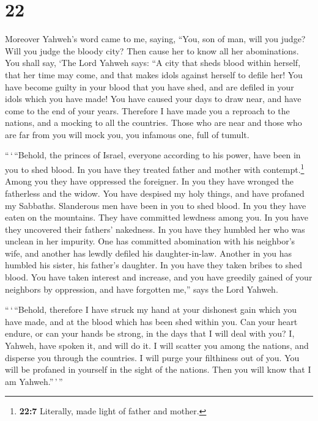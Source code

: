 \hypertarget{section-21}{%
\section{22}\label{section-21}}

 Moreover Yahweh's word came to me, saying, 
``You, son of man, will you judge? Will you judge the bloody city? Then
cause her to know all her abominations.  You shall say,
`The Lord Yahweh says: ``A city that sheds blood within herself, that
her time may come, and that makes idols against herself to defile her!
 You have become guilty in your blood that you have shed,
and are defiled in your idols which you have made! You have caused your
days to draw near, and have come to the end of your years. Therefore I
have made you a reproach to the nations, and a mocking to all the
countries.  Those who are near and those who are far from
you will mock you, you infamous one, full of tumult.

 ``\,`\,``Behold, the princes of Israel, everyone
according to his power, have been in you to shed blood. 
In you have they treated father and mother with contempt.\footnote{\textbf{22:7}
  Literally, made light of father and mother.} Among you they have
oppressed the foreigner. In you they have wronged the fatherless and the
widow.  You have despised my holy things, and have
profaned my Sabbaths.  Slanderous men have been in you to
shed blood. In you they have eaten on the mountains. They have committed
lewdness among you.  In you have they uncovered their
fathers' nakedness. In you have they humbled her who was unclean in her
impurity.  One has committed abomination with his
neighbor's wife, and another has lewdly defiled his daughter-in-law.
Another in you has humbled his sister, his father's daughter.
 In you have they taken bribes to shed blood. You have
taken interest and increase, and you have greedily gained of your
neighbors by oppression, and have forgotten me,'' says the Lord Yahweh.

 ``\,`\,``Behold, therefore I have struck my hand at your
dishonest gain which you have made, and at the blood which has been shed
within you.  Can your heart endure, or can your hands be
strong, in the days that I will deal with you? I, Yahweh, have spoken
it, and will do it.  I will scatter you among the
nations, and disperse you through the countries. I will purge your
filthiness out of you.  You will be profaned in yourself
in the sight of the nations. Then you will know that I am
Yahweh.''\,'\,''

